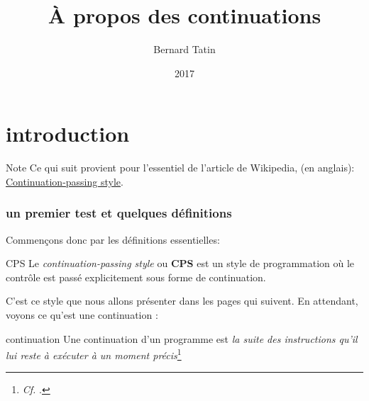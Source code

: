 \documentclass[A4,12pt]{scrartcl}%
\author{Bernard Tatin}
\date{2017}
\title{À propos des continuations}
\begin{document}
\maketitle
{}

\tableofcontents

\part{introduction}


\begin{note}{Note}
Ce qui suit provient pour l'essentiel de l'article de Wikipedia, \cite{wikienCPS} (en anglais): \href{https://en.wikipedia.org/wiki/Continuation-passing_style}{Continuation-passing style}.
\end{note}

\section{un premier test et quelques définitions}
Commençons donc par les définitions essentielles:

\begin{termdefinition}{CPS}
Le \emph{continuation-passing style} ou \textbf{CPS} est un style de programmation où le contrôle est passé explicitement sous forme de continuation.
\end{termdefinition}

C'est ce style que nous allons présenter dans les pages qui suivent. En attendant, voyons ce qu'est une continuation :

\begin{termdefinition}{continuation}
Une continuation d'un programme est \emph{la suite des instructions qu'il lui reste à exécuter à un moment précis}\footnote{\emph{Cf.}
\cite{wikifrcontinuations}.}
\end{termdefinition}
\end{document}
